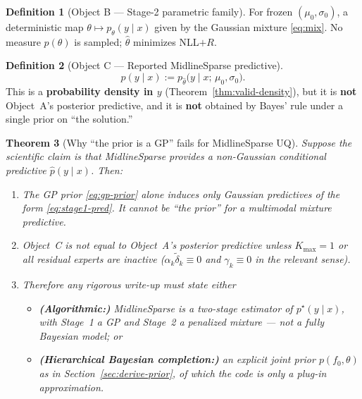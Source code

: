 \documentclass[11pt,a4paper]{article}
\theoremstyle{plain}
\newtheorem{theorem}{Theorem}[section]
\theoremstyle{definition}
\newtheorem{definition}[theorem]{Definition}
\theoremstyle{remark}
\newcommand{\tht}{\theta}
\newcommand{\Kmax}{K_{\max}}
\begin{document}
\begin{definition}[Object B --- Stage-2 parametric family]
For frozen \((\mu_0,\sigma_0)\), a deterministic map
\(\tht\mapsto p_\tht(y\mid x)\) given by the Gaussian mixture
\eqref{eq:mix}. No measure \(p(\tht)\) is sampled; \(\hat\tht\) minimizes NLL\(+R\).
\end{definition}

\begin{definition}[Object C --- Reported MidlineSparse predictive]
\[
  \hat p(y\mid x)
  :=
  p_{\hat\tht}\!\bigl(y\mid x;\,\mu_0,\sigma_0\bigr).
\]
This is a \textbf{probability density in \(y\)} (Theorem~\ref{thm:valid-density}),
but it is \textbf{not} Object~A's posterior predictive, and it is \textbf{not}
obtained by Bayes' rule under a single prior on ``the solution.''
\end{definition}

\begin{theorem}[Why ``the prior is a GP'' fails for MidlineSparse UQ]
\label{thm:not-just-gp}
Suppose the scientific claim is that MidlineSparse provides a non-Gaussian
conditional predictive \(\hat p(y\mid x)\). Then:
\begin{enumerate}[label=(\roman*)]
  \item The GP prior \eqref{eq:gp-prior} alone induces only Gaussian predictives
        of the form \eqref{eq:stage1-pred}. It cannot be ``the prior'' for a
        multimodal mixture predictive.
  \item Object~C is not equal to Object~A's posterior predictive unless
        \(\Kmax=1\) or all residual experts are inactive (\(\alpha_k\tilde\delta_k\equiv 0\)
        and \(\gamma_k\equiv 0\) in the relevant sense).
  \item Therefore any rigorous write-up must state either
        \begin{itemize}
          \item \textbf{(Algorithmic:)} MidlineSparse is a two-stage estimator of
                \(p^\star(y\mid x)\), with Stage~1 a GP and Stage~2 a penalized
                mixture --- \emph{not} a fully Bayesian model; or
          \item \textbf{(Hierarchical Bayesian completion:)} an explicit joint prior
                \(p(f_0,\tht)\) as in Section~\ref{sec:derive-prior}, of which the
                code is only a plug-in approximation.
        \end{itemize}
\end{enumerate}
\end{theorem}
\end{document}
